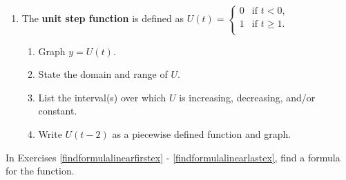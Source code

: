 \begin{enumerate}
\setcounter{enumi}{\value{HW}}

\item  \label{unitstepexercise} The \textbf{unit step function} is defined as $U(t) = \begin{cases} 
    0 &  \text{if $t<0$, } \\
    1  & \text{if $t \geq 1$.} \\
   \end{cases}$

\begin{enumerate}

\item  Graph $y = U(t)$.

\item  State the domain and range of $U$.

\item  List the interval(s) over which $U$ is increasing, decreasing, and/or constant.

\item  Write $U(t-2)$ as a piecewise defined function and graph.
 
\end{enumerate}


\setcounter{HW}{\value{enumi}}
\end{enumerate}


In Exercises \ref{findformulalinearfirstex} - \ref{findformulalinearlastex}, find a formula for the function.

